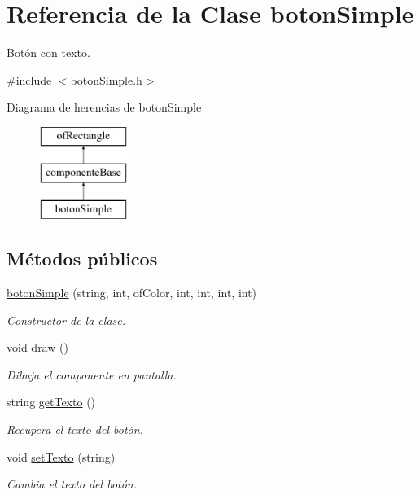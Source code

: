 \hypertarget{classboton_simple}{}\section{Referencia de la Clase boton\+Simple}
\label{classboton_simple}


Botón con texto.  




{\ttfamily \#include $<$boton\+Simple.\+h$>$}

Diagrama de herencias de boton\+Simple\begin{figure}[H]
\begin{center}
\leavevmode
\includegraphics[height=3.000000cm]{classboton_simple}
\end{center}
\end{figure}
\subsection*{Métodos públicos}
\begin{DoxyCompactItemize}
\item 
\hyperlink{classboton_simple_acbcb5c2f8c673c1de738a2282fdca5de}{boton\+Simple} (string, int, of\+Color, int, int, int, int)
\begin{DoxyCompactList}\small\item\em Constructor de la clase. \end{DoxyCompactList}\item 
void \hyperlink{classboton_simple_a64baaac5439d0ad0d2ec1a11e23a8ad2}{draw} ()
\begin{DoxyCompactList}\small\item\em Dibuja el componente en pantalla. \end{DoxyCompactList}\item 
string \hyperlink{classboton_simple_a57beca159c5aa3ee7055cd3d8f12d2b7}{get\+Texto} ()
\begin{DoxyCompactList}\small\item\em Recupera el texto del botón. \end{DoxyCompactList}\item 
void \hyperlink{classboton_simple_a2e21e1c5c56d5606cc6f63c5f2bf71b7}{set\+Texto} (string)
\begin{DoxyCompactList}\small\item\em Cambia el texto del botón. \end{DoxyCompactList}\end{DoxyCompactItemize}
